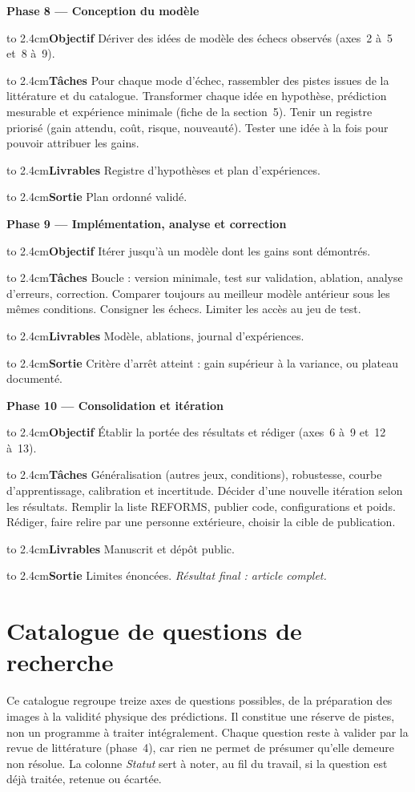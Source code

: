 \documentclass[11pt,a4paper]{article}
\newcommand{\phase}[2]{\par\bigskip\noindent\textbf{Phase #1 --- #2}\par\nopagebreak\smallskip}
\newcommand{\champ}[1]{\par\noindent\hangindent=2.4cm\hangafter=1\hbox to 2.4cm{\textbf{#1}\hfil}\ignorespaces}
\begin{document}
\phase{8}{Conception du modèle}
\champ{Objectif} Dériver des idées de modèle des échecs observés (axes~2 à~5 et~8 à~9).
\champ{Tâches} Pour chaque mode d'échec, rassembler des pistes issues de la littérature et du catalogue. Transformer chaque idée en hypothèse, prédiction mesurable et expérience minimale (fiche de la section~5). Tenir un registre priorisé (gain attendu, coût, risque, nouveauté). Tester une idée à la fois pour pouvoir attribuer les gains.
\champ{Livrables} Registre d'hypothèses et plan d'expériences.
\champ{Sortie} Plan ordonné validé.

\phase{9}{Implémentation, analyse et correction}
\champ{Objectif} Itérer jusqu'à un modèle dont les gains sont démontrés.
\champ{Tâches} Boucle : version minimale, test sur validation, ablation, analyse d'erreurs, correction. Comparer toujours au meilleur modèle antérieur sous les mêmes conditions. Consigner les échecs. Limiter les accès au jeu de test.
\champ{Livrables} Modèle, ablations, journal d'expériences.
\champ{Sortie} Critère d'arrêt atteint : gain supérieur à la variance, ou plateau documenté.

\phase{10}{Consolidation et itération}
\champ{Objectif} Établir la portée des résultats et rédiger (axes~6 à~9 et~12 à~13).
\champ{Tâches} Généralisation (autres jeux, conditions), robustesse, courbe d'apprentissage, calibration et incertitude. Décider d'une nouvelle itération selon les résultats. Remplir la liste REFORMS, publier code, configurations et poids. Rédiger, faire relire par une personne extérieure, choisir la cible de publication.
\champ{Livrables} Manuscrit et dépôt public.
\champ{Sortie} Limites énoncées. \emph{Résultat final : article complet.}

\section{Catalogue de questions de recherche}

Ce catalogue regroupe treize axes de questions possibles, de la préparation des images à la validité physique des prédictions. Il constitue une réserve de pistes, non un programme à traiter intégralement. Chaque question reste à valider par la revue de littérature (phase~4), car rien ne permet de présumer qu'elle demeure non résolue. La colonne \emph{Statut} sert à noter, au fil du travail, si la question est déjà traitée, retenue ou écartée.
\end{document}
